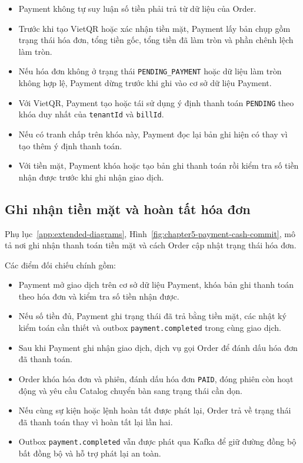 \begin{itemize}
  \item Payment không tự suy luận số tiền phải trả từ dữ liệu của Order.
  \item Trước khi tạo VietQR hoặc xác nhận tiền mặt, Payment lấy bản chụp gồm trạng thái hóa đơn, tổng tiền gốc, tổng tiền đã làm tròn và phần chênh lệch làm tròn.
  \item Nếu hóa đơn không ở trạng thái \texttt{PENDING\_PAYMENT} hoặc dữ liệu làm tròn không hợp lệ, Payment dừng trước khi ghi vào cơ sở dữ liệu Payment.
  \item Với VietQR, Payment tạo hoặc tái sử dụng ý định thanh toán \texttt{PENDING} theo khóa duy nhất của \texttt{tenantId} và \texttt{billId}.
  \item Nếu có tranh chấp trên khóa này, Payment đọc lại bản ghi hiện có thay vì tạo thêm ý định thanh toán.
  \item Với tiền mặt, Payment khóa hoặc tạo bản ghi thanh toán rồi kiểm tra số tiền nhận được trước khi ghi nhận giao dịch.
\end{itemize}

\subsection{Ghi nhận tiền mặt và hoàn tất hóa đơn}

Phụ lục~\ref{app:extended-diagrams}, Hình~\ref{fig:chapter5-payment-cash-commit}, mô tả nơi ghi nhận thanh toán tiền mặt và cách Order cập nhật trạng thái hóa đơn.

Các điểm đối chiếu chính gồm:

\begin{itemize}
  \item Payment mở giao dịch trên cơ sở dữ liệu Payment, khóa bản ghi thanh toán theo hóa đơn và kiểm tra số tiền nhận được.
  \item Nếu số tiền đủ, Payment ghi trạng thái đã trả bằng tiền mặt, các nhật ký kiểm toán cần thiết và outbox \texttt{payment.completed} trong cùng giao dịch.
  \item Sau khi Payment ghi nhận giao dịch, dịch vụ gọi Order để đánh dấu hóa đơn đã thanh toán.
  \item Order khóa hóa đơn và phiên, đánh dấu hóa đơn \texttt{PAID}, đóng phiên còn hoạt động và yêu cầu Catalog chuyển bàn sang trạng thái cần dọn.
  \item Nếu cùng sự kiện hoặc lệnh hoàn tất được phát lại, Order trả về trạng thái đã thanh toán thay vì hoàn tất lại lần hai.
  \item Outbox \texttt{payment.completed} vẫn được phát qua Kafka để giữ đường đồng bộ bất đồng bộ và hỗ trợ phát lại an toàn.
\end{itemize}

